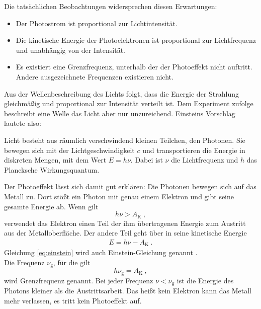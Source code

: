Die tatsächlichen Beobachtungen widersprechen diesen Erwartungen:
\begin{itemize}
	\item Der Photostrom ist proportional zur Lichtintensität.
	\item Die kinetische Energie der Photoelektronen ist proportional zur Lichtfrequenz und unabhängig von der Intensität.
	\item Es existiert eine Grenzfrequenz, unterhalb der der Photoeffekt nicht auftritt. Andere ausgezeichnete Frequenzen existieren nicht.
\end{itemize}
Aus der Wellenbeschreibung des Lichts folgt, dass die Energie der Strahlung gleichmäßig und proportional zur Intensität verteilt ist. Dem Experiment zufolge beschreibt eine Welle das Licht aber nur unzureichend. Einsteins Vorschlag lautete also:
\par
\begingroup
{}
\rightskip\leftskip
{Licht besteht aus räumlich verschwindend kleinen Teilchen, den Photonen. Sie bewegen sich mit der Lichtgeschwindigkeit $c$ und transportieren die Energie in diskreten Mengen, mit dem Wert $E=h\nu$. Dabei ist $\nu$ die Lichtfrequenz und $h$ das Plancksche Wirkungsquantum.}
\par
\endgroup
Der Photoeffekt lässt sich damit gut erklären: Die Photonen bewegen sich auf das Metall zu. Dort stößt ein Photon mit genau einem Elektron und gibt seine gesamte Energie ab. Wenn gilt
\[ h\nu > A_\text{K} \ ,\]
verwendet das Elektron einen Teil der ihm übertragenen Energie zum Austritt aus der Metalloberfläche. Der andere Teil geht über in seine kinetische Energie
\begin{align}\label{eq:einstein}
	E = h\nu - A_\text{K} \ .
\end{align}
Gleichung \ref{eq:einstein} wird auch Einstein-Gleichung genannt \cite{Gerthsen}. \\
Die Frequenz $\nu_\text{g}$, für die gilt
\[ h\nu_\text{g} = A_\text{K} \ , \]
wird Grenzfrequenz genannt. Bei jeder Frequenz $\nu<\nu_\text{g}$ ist die Energie des Photons kleiner als die Austrittsarbeit. Das heißt kein Elektron kann das Metall mehr verlassen, es tritt kein Photoeffekt auf.